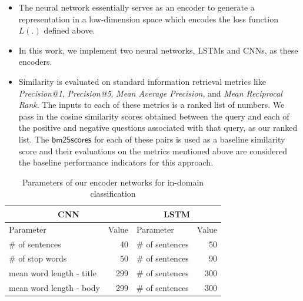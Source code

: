 \documentclass{sigkddExp}
\begin{document}
\begin{itemize}[topsep=0pt,itemsep=-1ex,partopsep=1ex,parsep=1ex]
  \item The neural network essentially serves as an encoder to generate a representation in a low-dimension space which encodes the loss function $L(.)$ defined above.
  \item In this work, we implement two neural networks, LSTMs and CNNs, as these encoders.
  \item Similarity is evaluated on standard information retrieval metrics like \textit{Precision@1}, \textit{Precision@5}, \textit{Mean Average Precision}, and \textit{Mean Reciprocal Rank}. The inputs to each of these metrics is a ranked list of numbers. We pass in the cosine similarity scores obtained between the query and each of the positive and negative questions associated with that query, as our ranked list. The $\mathsf{bm25 scores}$ for each of these pairs is used as a baseline similarity score and their evaluations on the metrics mentioned above are considered the baseline performance indicators for this approach.
\end{itemize}

\begin{table}[h]
\begin{tabular}{l|r|l|r}
      \multicolumn{2}{c|}{CNN}
     & \multicolumn{2}{c}{LSTM}
     \\
     \toprule
     Parameter
     & Value
     & Parameter
     & Value
     \\
     \# of sentences
     & 40
     & \# of sentences
     & 50
     \\
     \# of stop words 
     & 50
     & \# of sentences
     & 90
     \\
     mean word length - title
     & 299
     & \# of sentences
     & 300
     \\
     mean word length - body
     & 299
     & \# of sentences
     & 300
\end{tabular}
\caption{Parameters of our encoder networks for in-domain classification}
\label{tab:indomain}
\end{table}
\end{document}
